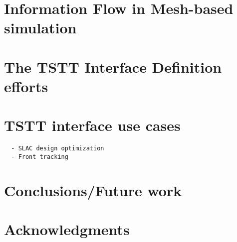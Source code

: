 \documentclass[11pt]{article}
\begin{document}
\section{Information Flow in Mesh-based simulation}



\section{The TSTT Interface Definition efforts}



\section{TSTT interface use cases}




\begin{verbatim}
  - SLAC design optimization 
  - Front tracking
\end{verbatim}

\section{Conclusions/Future work}

\section*{Acknowledgments} 



\end{document}
